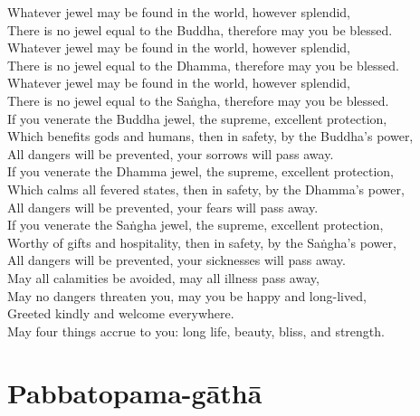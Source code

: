 \begin{paritta}
Whatever jewel may be found in the world, however splendid,\\
There is no jewel equal to the Buddha, therefore may you be blessed.\\
Whatever jewel may be found in the world, however splendid,\\
There is no jewel equal to the Dhamma, therefore may you be blessed.\\
Whatever jewel may be found in the world, however splendid,\\
There is no jewel equal to the Saṅgha, therefore may you be blessed.\\
If you venerate the Buddha jewel, the supreme, excellent protection,\\
Which benefits gods and humans, then in safety, by the Buddha's power,\\
All dangers will be prevented, your sorrows will pass away.\\
If you venerate the Dhamma jewel, the supreme, excellent protection,\\
Which calms all fevered states, then in safety, by the Dhamma's power,\\
All dangers will be prevented, your fears will pass away.\\
If you venerate the Saṅgha jewel, the supreme, excellent protection,\\
Worthy of gifts and hospitality, then in safety, by the Saṅgha's power,\\
All dangers will be prevented, your sicknesses will pass away.\\
May all calamities be avoided, may all illness pass away,\\
May no dangers threaten you, may you be happy and long-lived,\\
Greeted kindly and welcome everywhere.\\
May four things accrue to you: long life, beauty, bliss, and strength.

\section{Pabbatopama-gāthā}




\end{paritta}
